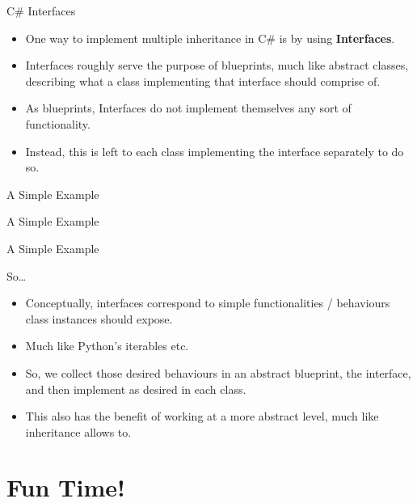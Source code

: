 \documentclass[aspectratio=169, 12pt, xcolor=table]{beamer}
\begin{document}
	\begin{frame}{C\# Interfaces}
		\begin{itemize}[<+->]
			\item One way to implement multiple inheritance in C\# is by using \textbf{Interfaces}.
			\item Interfaces roughly serve the purpose of blueprints, much like abstract classes, describing what a class implementing that interface should comprise of.
			\item As blueprints, Interfaces do not implement themselves any sort of functionality.
			\item Instead, this is left to each class implementing the interface separately to do so.
		\end{itemize}
	\end{frame}

	\begin{frame}{A Simple Example}
		
	\end{frame}
	
	\begin{frame}{A Simple Example}
		
	\end{frame}

	\begin{frame}{A Simple Example}
		
	\end{frame}
	
	\begin{frame}{So\ldots}
		\begin{itemize}[<+->]
			\item Conceptually, interfaces correspond to simple functionalities / behaviours class instances should expose.
			\item Much like Python's iterables etc.
			\item So, we collect those desired behaviours in an abstract blueprint, the interface, and then implement as desired in each class.
			\item This also has the benefit of working at a more abstract level, much like inheritance allows to.
		\end{itemize}
	\end{frame}
	
	\section{Fun Time!}\label{sec:fun-time}
	
\end{document}
